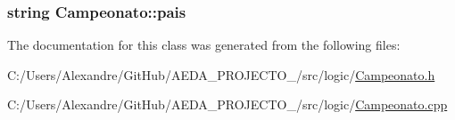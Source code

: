 \subsubsection[{pais}]{\setlength{\rightskip}{0pt plus 5cm}string Campeonato\+::pais\hspace{0.3cm}{\ttfamily [private]}}\label{class_campeonato_a9f7011b322e9ae5fe6504ca5946268bf}


The documentation for this class was generated from the following files\+:\begin{DoxyCompactItemize}
\item 
C\+:/\+Users/\+Alexandre/\+Git\+Hub/\+A\+E\+D\+A\+\_\+\+P\+R\+O\+J\+E\+C\+T\+O\+\_/src/logic/\hyperlink{_campeonato_8h}{Campeonato.\+h}\item 
C\+:/\+Users/\+Alexandre/\+Git\+Hub/\+A\+E\+D\+A\+\_\+\+P\+R\+O\+J\+E\+C\+T\+O\+\_/src/logic/\hyperlink{_campeonato_8cpp}{Campeonato.\+cpp}\end{DoxyCompactItemize}
